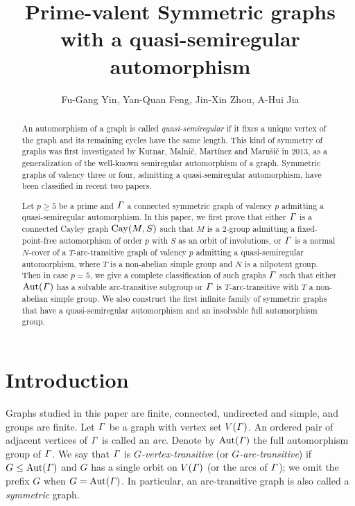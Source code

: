 \documentclass[12pt,reqno]{amsart}
\title[ graphs with a quasi-semiregular automorphism]
 { Prime-valent Symmetric graphs with a quasi-semiregular automorphism}
\author{Fu-Gang Yin, Yan-Quan Feng, Jin-Xin Zhou, A-Hui Jia}%
\numberwithin {equation} {section}
\begin{document}
\maketitle

\begin{abstract}
An automorphism of a graph is called {\em quasi-semiregular} if it fixes a unique vertex of the graph and its remaining cycles have the same length. This kind of symmetry of graphs was first investigated by Kutnar, Malni\v{c}, Mart\'{i}nez and Maru\v{s}i\v{c} in 2013, as a generalization of the well-known semiregular automorphism of a graph. Symmetric graphs of valency three or four, admitting a quasi-semiregular automorphism, have been classified in recent two papers.

Let $p\geq 5$ be a prime and ${\it \Gamma}$ a connected symmetric graph of valency $p$ admitting a quasi-semiregular automorphism. In this paper, we first prove that either ${\it \Gamma}$ is a connected Cayley graph $\mathrm{Cay}(M,S)$ such that $M$ is a $2$-group admitting a fixed-point-free automorphism of order $p$ with $S$ as an orbit of involutions, or ${\it \Gamma}$ is a normal $N$-cover of a $T$-arc-transitive graph of valency $p$ admitting a quasi-semiregular automorphism, where $T$ is a non-abelian simple group and $N$ is a nilpotent group. Then in case $p=5$, we give a complete classification of such graphs ${\it \Gamma}$ such that either $\mathrm{Aut}({\it \Gamma})$ has a solvable arc-transitive subgroup or ${\it \Gamma}$ is $T$-arc-transitive with $T$ a non-abelian simple group. We also construct the first infinite family of symmetric graphs that have a quasi-semiregular automorphism and an insolvable full automorphism group.
\end{abstract}




\section{Introduction}

Graphs studied in this paper are finite, connected, undirected and simple, and groups are finite.
Let ${\it \Gamma}$ be a graph with vertex set $V({\it \Gamma})$. An ordered pair of adjacent vertices of ${\it \Gamma}$ is called an {\em arc}.
Denote by $\mathrm{Aut}({\it \Gamma})$ the full automorphism group of ${\it \Gamma}$. We say that ${\it \Gamma}$ is {\em $G$-vertex-transitive} (or {\em $G$-arc-transitive}) if $G\leq\mathrm{Aut}({\it \Gamma})$ and $G$ has a single orbit on $V({\it \Gamma})$ (or the arcs of ${\it \Gamma}$); we omit the prefix $G$ when $G=\mathrm{Aut}({\it \Gamma})$. In particular, an arc-transitive graph is also called a \emph{symmetric} graph.
\end{document}
